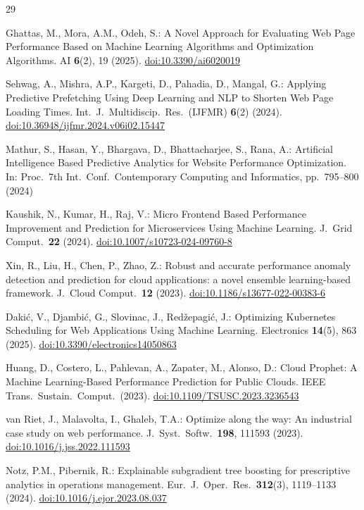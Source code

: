 \documentclass{svproc}
\begin{document}
\begin{thebibliography}{29}

Ghattas, M., Mora, A.M., Odeh, S.: A Novel Approach for Evaluating Web Page Performance Based on Machine Learning Algorithms and Optimization Algorithms. AI \textbf{6}(2), 19 (2025). \url{doi:10.3390/ai6020019}

Sehwag, A., Mishra, A.P., Kargeti, D., Pahadia, D., Mangal, G.: Applying Predictive Prefetching Using Deep Learning and NLP to Shorten Web Page Loading Times. Int.\ J.\ Multidiscip.\ Res.\ (IJFMR) \textbf{6}(2) (2024). \url{doi:10.36948/ijfmr.2024.v06i02.15447}

Mathur, S., Hasan, Y., Bhargava, D., Bhattacharjee, S., Rana, A.: Artificial Intelligence Based Predictive Analytics for Website Performance Optimization. In: Proc.\ 7th Int.\ Conf.\ Contemporary Computing and Informatics, pp.\ 795--800 (2024)

Kaushik, N., Kumar, H., Raj, V.: Micro Frontend Based Performance Improvement and Prediction for Microservices Using Machine Learning. J.\ Grid Comput.\ \textbf{22} (2024). \url{doi:10.1007/s10723-024-09760-8}

Xin, R., Liu, H., Chen, P., Zhao, Z.: Robust and accurate performance anomaly detection and prediction for cloud applications: a novel ensemble learning-based framework. J.\ Cloud Comput.\ \textbf{12} (2023). \url{doi:10.1186/s13677-022-00383-6}

Daki\'{c}, V., Djambi\'{c}, G., Slovinac, J., Red\v{z}epagi\'{c}, J.: Optimizing Kubernetes Scheduling for Web Applications Using Machine Learning. Electronics \textbf{14}(5), 863 (2025). \url{doi:10.3390/electronics14050863}

Huang, D., Costero, L., Pahlevan, A., Zapater, M., Alonso, D.: Cloud Prophet: A Machine Learning-Based Performance Prediction for Public Clouds. IEEE Trans.\ Sustain.\ Comput.\ (2023). \url{doi:10.1109/TSUSC.2023.3236543}

van Riet, J., Malavolta, I., Ghaleb, T.A.: Optimize along the way: An industrial case study on web performance. J.\ Syst.\ Softw.\ \textbf{198}, 111593 (2023). \url{doi:10.1016/j.jss.2022.111593}

Notz, P.M., Pibernik, R.: Explainable subgradient tree boosting for prescriptive analytics in operations management. Eur.\ J.\ Oper.\ Res.\ \textbf{312}(3), 1119--1133 (2024). \url{doi:10.1016/j.ejor.2023.08.037}


\end{thebibliography}
\end{document}
